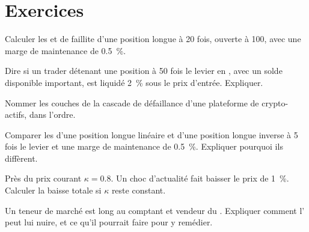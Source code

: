 \section{Exercices}

\begin{exercise}[$\star$]\label{exo:m3:margin-liquidation-and-loss-allocation:1}
Calculer les  et de faillite d'une position longue à 20 fois, ouverte à 100, avec une marge de maintenance de 0.5~\%.
\end{exercise}

\begin{exercise}[$\star$]\label{exo:m3:margin-liquidation-and-loss-allocation:2}
Dire si un trader détenant une position à 50 fois le levier en , avec un solde disponible important, est liquidé 2~\% sous
le prix d'entrée. Expliquer.
\end{exercise}

\begin{exercise}[$\star$]\label{exo:m3:margin-liquidation-and-loss-allocation:3}
Nommer les couches de la cascade de défaillance d'une plateforme de crypto-actifs, dans l'ordre.
\end{exercise}

\begin{exercise}[$\star\star$]\label{exo:m3:margin-liquidation-and-loss-allocation:4}
Comparer les  d'une position longue linéaire et d'une position longue inverse à 5 fois le levier et une marge de maintenance de 0.5~\%. Expliquer
pourquoi ils diffèrent.
\end{exercise}

\begin{exercise}[$\star\star$]\label{exo:m3:margin-liquidation-and-loss-allocation:5}
Près du prix courant $\kappa = 0.8$. Un choc d'actualité fait baisser le prix de 1~\%. Calculer la baisse totale si $\kappa$
reste constant.
\end{exercise}

\begin{exercise}[$\star\star$]\label{exo:m3:margin-liquidation-and-loss-allocation:6}
Un teneur de marché est long au comptant et vendeur du . Expliquer comment l' peut lui nuire, et ce qu'il pourrait faire pour y remédier.
\end{exercise}


